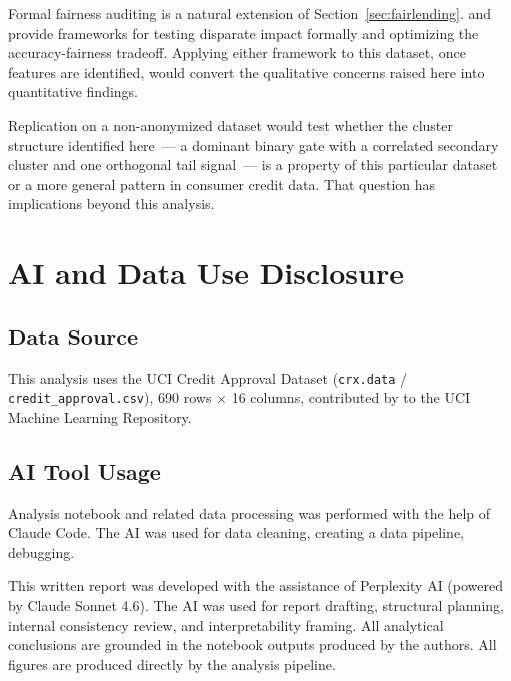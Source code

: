 \documentclass[11pt]{article}
\begin{document}
Formal fairness auditing is a natural extension of Section~\ref{sec:fairlending}. \citet{kozodoi2022} and \citet{dumitrescu2022} provide frameworks for testing disparate impact formally and optimizing the accuracy-fairness tradeoff. Applying either framework to this dataset, once features are identified, would convert the qualitative concerns raised here into quantitative findings.

Replication on a non-anonymized dataset would test whether the cluster structure identified here~--- a dominant binary gate with a correlated secondary cluster and one orthogonal tail signal~--- is a property of this particular dataset or a more general pattern in consumer credit data. That question has implications beyond this analysis.

\newpage

\section{AI and Data Use Disclosure}

\subsection{Data Source}

This analysis uses the UCI Credit Approval Dataset (\texttt{crx.data} / \texttt{credit\_approval.csv}), 690 rows $\times$ 16 columns, contributed by \citet{quinlan1987} to the UCI Machine Learning Repository.

\subsection{AI Tool Usage}
Analysis notebook and related data processing was performed with the help of Claude Code. The AI was used for data cleaning, creating a data pipeline, debugging. 

This written report was developed with the assistance of Perplexity AI (powered by Claude Sonnet 4.6). The AI was used for report drafting, structural planning, internal consistency review, and interpretability framing. 
All analytical conclusions are grounded in the notebook outputs produced by the authors. All figures are produced directly by the analysis pipeline.
\end{document}

